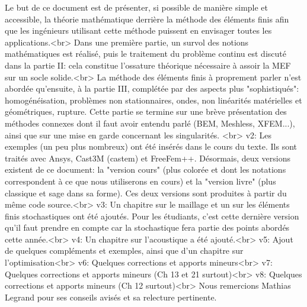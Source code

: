 Le but de ce document est de présenter, si possible de manière simple et accessible, la théorie mathématique derrière la méthode des éléments finis afin que les ingénieurs utilisant cette méthode puissent en envisager toutes les applications.<br>
Dans une première partie, un survol des notions mathématiques est réalisé, puis le traitement du problème continu est discuté dans la partie II: cela constitue l'ossature théorique nécessaire à assoir la MEF sur un socle solide.<br>
La méthode des éléments finis à proprement parler n'est abordée qu'ensuite, à la partie III, complétée par des aspects plus "sophistiqués": homogénéisation, problèmes non stationnaires, ondes, non linéarités matérielles et géométriques, rupture. Cette partie se termine sur une brève présentation des méthodes connexes dont il faut avoir entendu parlé (BEM, Meshless, XFEM...), ainsi que sur une mise en garde concernant les singularités. <br>
v2: Les exemples (un peu plus nombreux) ont été insérés dans le cours du texte. Ils sont traités avec Ansys, Cast3M (castem) et FreeFem++. 
Désormais, deux versions existent de ce document: la "version cours" (plus colorée et dont les notations correspondent à ce que nous utiliserons en cours) et la "version livre" (plus classique et sage dans sa forme). Ces deux versions sont produites à partir du même code source.<br>
v3: Un chapitre sur le maillage et un sur les éléments finis stochastiques ont été ajoutés. Pour les étudiants, c'est cette dernière version qu'il faut prendre en compte car la stochastique fera partie des points abordés cette année.<br>
v4: Un chapitre sur l'acoustique a été ajouté.<br>
v5: Ajout de quelques compléments et exemples, ainsi que d'un chapitre sur l'optimisation<br>
v6: Quelques corrections et apports mineurs<br>
v7: Quelques corrections et apports mineurs (Ch 13 et 21 surtout)<br>
v8: Quelques corrections et apports mineurs (Ch 12 surtout)<br>
Nous remercions Mathias Legrand pour ses conseils avisés et sa relecture pertinente.